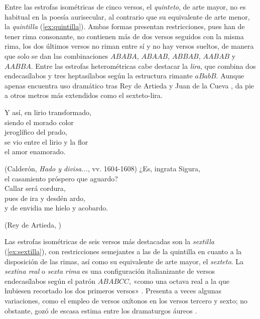 Entre las estrofas isométricas de cinco versos, el \textit{quinteto}, de arte mayor, no es habitual en la poesía aurisecular, al contrario que su equivalente de arte menor, la \textit{quintilla} (\ref{ex:quintilla}). Ambas formas presentan restricciones, pues han de tener rima consonante, no contienen más de dos versos seguidos con la misma rima, los dos últimos versos no riman entre sí y no hay versos sueltos, de manera que solo se dan las combinaciones $ABABA$, $ABAAB$, $ABBAB$, $AABAB$ y $AABBA$. Entre las estrofas heterométricas cabe destacar la \textit{lira}, que combina dos endecasílabos y tres heptasílabos según la estructura rimante $aBabB$. Aunque apenas encuentra uso dramático tras Rey de Artieda y Juan de la Cueva \parencite[257]{navarrotomas1991}, da pie a otros metros más extendidos como el sexteto-lira.

 \begin{exe}
	\ex\label{ex:quintilla}Y así, en lirio transformado,\\
	siendo el morado color\\
	jeroglífico del prado,\\
	se vio entre el lirio y la flor\\
	el amor enamorado.\\	
	\strut\hfill(Calderón, \textit{Hado y divisa...}, vv. 1604-1608\nocite{calderon_hadoydivisa})
	\ex\label{ex:lira}¿Es, ingrata Sigura,\\
	el casamiento próspero que aguardo?\\
	Callar será cordura,\\
	pues de ira y desdén ardo,\\
	y de envidia me hielo y acobardo.\\
	\strut\hfill(Rey de Artieda, )
\end{exe}

Las estrofas isométricas de seis versos más destacadas son la \textit{sextilla} (\ref{ex:sextilla}), con restricciones semejantes a las de la quintilla en cuanto a la disposición de las rimas, así como su equivalente de arte mayor, el \textit{sexteto}. La \textit{sextina real} o \textit{sexta rima} es una configuración italianizante de versos endecasílabos según el patrón $ABABCC$, «como una octava real a la que hubiesen recortado los dos primeros versos» \parencite[276]{baehr1997}. Presenta a veces algunas variaciones, como el empleo de versos oxítonos en los versos tercero y sexto; no obstante, gozó de escasa estima entre los dramaturgos áureos \parencite[256]{navarrotomas1991}.

